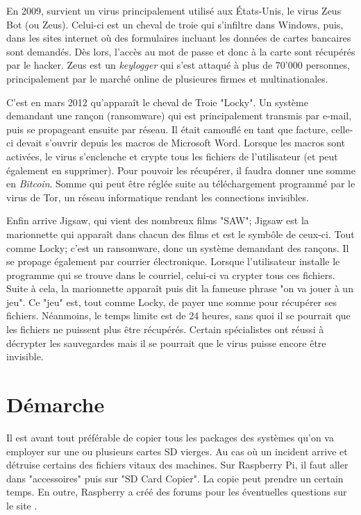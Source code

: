 En 2009, survient un virus principalement utilisé aux \'Etats-Unis, le virus Zeus Bot (ou Zeus). Celui-ci est un cheval de troie qui s'infiltre dans Windows, puis, dans les sites internet où des formulaires incluant les données de cartes bancaires sont demandés. Dès lors, l'accès au mot de passe et donc à la carte sont récupérés par le hacker. Zeus est un \textit{keylogger} qui s'est attaqué à plus de 70'000 personnes, principalement par le marché online de plusieures firmes et multinationales.  

C'est en mars 2012 qu'apparaît le cheval de Troie "Locky". Un système demandant une rançon (ransomware) qui est principalement transmis par e-mail, puis se propageant ensuite par réseau. Il était camouflé en tant que facture, celle-ci devait s'ouvrir depuis les macros de Microsoft Word. Lorsque les macros sont activées, le virus s'enclenche et crypte tous les fichiers de l'utilisateur (et peut également en supprimer). Pour pouvoir les récupérer, il faudra donner une somme en \textit{Bitcoin}. Somme qui peut être réglée suite au téléchargement programmé par le virus de Tor, un réseau informatique rendant les connections invisibles.

Enfin arrive Jigsaw, qui vient des nombreux films "SAW"; Jigsaw est la marionnette qui apparaît dans chacun des films et est le symbôle de ceux-ci. Tout comme Locky; c'est un ransomware, donc un système demandant des rançons. Il se propage également par courrier électronique. Lorsque l'utilisateur installe le programme qui se trouve dans le courriel, celui-ci va crypter tous ces fichiers. Suite à cela, la marionnette apparaît puis dit la fameuse phrase "on va jouer à un jeu". Ce "jeu" est, tout comme Locky, de payer une somme pour récupérer ses fichiers. Néanmoins, le temps limite est de 24 heures, sans quoi il se pourrait que les fichiers ne puissent plus être récupérés. Certain spécialistes ont réussi à décrypter les sauvegardes mais il se pourrait que le virus puisse encore être invisible.
\medskip
{}    
\section{Démarche}
	Il est avant tout préférable de copier tous les packages des systèmes qu'on va employer sur une ou plusieurs cartes SD vierges. Au cas où un incident arrive et détruise certains des fichiers vitaux des machines. Sur Raspberry Pi, il faut aller dans "accessoires" puis sur "SD Card Copier". La copie peut prendre un certain temps. En outre, Raspberry a créé des forums pour les éventuelles questions sur le site . 
	
